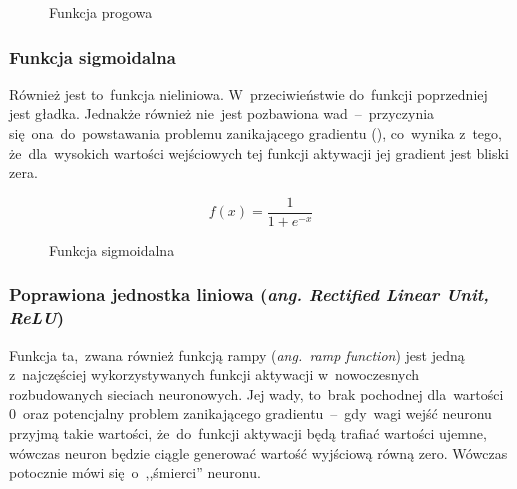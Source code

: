 \begin{figure}[H]
    \centering
    \caption{Funkcja progowa}
\end{figure}

\subsubsection{Funkcja sigmoidalna} \label{sssec:sigmoid}
Również jest to~funkcja nieliniowa. W~przeciwieństwie do~funkcji poprzedniej jest gładka. Jednakże również nie~jest
pozbawiona wad~--~przyczynia się~ona~do~powstawania problemu zanikającego gradientu (\cite{vanishing-gradient}),
co~wynika z~tego, że~dla~wysokich wartości wejściowych tej funkcji aktywacji jej gradient jest bliski zera.

\begin{equation}
	f(x) = \frac{1}{1+e^{-x}}
\end{equation}

\begin{figure}[H]
    \centering
    \caption{Funkcja sigmoidalna}
\end{figure}

\subsubsection{Poprawiona jednostka liniowa (\textit{ang. Rectified Linear Unit, ReLU})}
Funkcja ta,~zwana również funkcją rampy (\textit{ang.~ramp function}) jest jedną z~najczęściej wykorzystywanych funkcji
aktywacji w~nowoczesnych rozbudowanych sieciach neuronowych. Jej wady, to~brak pochodnej dla~wartości 0~oraz potencjalny
problem zanikającego gradientu~--~gdy~wagi wejść neuronu przyjmą takie wartości, że~do~funkcji aktywacji będą trafiać
wartości ujemne, wówczas neuron będzie ciągle generować wartość wyjściową równą zero. Wówczas potocznie mówi
się~o~,,śmierci'' neuronu.

